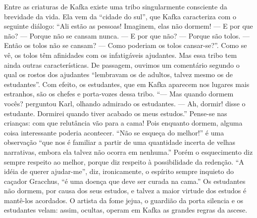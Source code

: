 Entre as criaturas de Kafka existe uma tribo singularmente consciente da
brevidade da vida. Ela vem da ``cidade do sul'', que Kafka caracteriza
com o seguinte diálogo: ``Ali estão as pessoas! Imaginem, elas não
dormem! --- E por que não? --- Porque não se cansam nunca. --- E por que
não? --- Porque são tolos. --- Então os tolos não se cansam? --- Como
poderiam os tolos cansar-se?''. Como se vê, os tolos têm afinidades com
os infatigáveis ajudantes. Mas essa tribo tem ainda outras
características. De passagem, ouvimos um comentário segundo o qual os
rostos dos ajudantes ``lembravam os de adultos, talvez mesmo os de
estudantes''. Com efeito, os estudantes, que em Kafka aparecem nos
lugares mais estranhos, são os chefes e porta-vozes dessa tribo. ``---
Mas quando dormem vocês? perguntou Karl, olhando admirado os estudantes.
--- Ah, dormir! disse o estudante. Dormirei quando tiver acabado os meus
estudos.'' Pense-se nas crianças: com que relutância vão para a cama!
Pois enquanto dormem, alguma coisa interessante poderia acontecer. ``Não
se esqueça do melhor!'' é uma observação ``que nos é familiar a partir
de uma quantidade incerta de velhas narrativas, embora ela talvez não
ocorra em nenhuma.'' Porém o esquecimento diz sempre respeito ao melhor,
porque diz respeito à possibilidade da redenção. ``A idéia de querer
ajudar-me'', diz, ironicamente, o espírito sempre inquieto do caçador
Gracchus, ``é uma doença que deve ser curada na cama.'' Os estudantes
não dormem, por causa dos seus estudos, e talvez a maior virtude dos
estudos é mantê-los acordados. O artista da fome jejua, o guardião da
porta silencia e os estudantes velam: assim, ocultas, operam em Kafka as
grandes regras da ascese.

